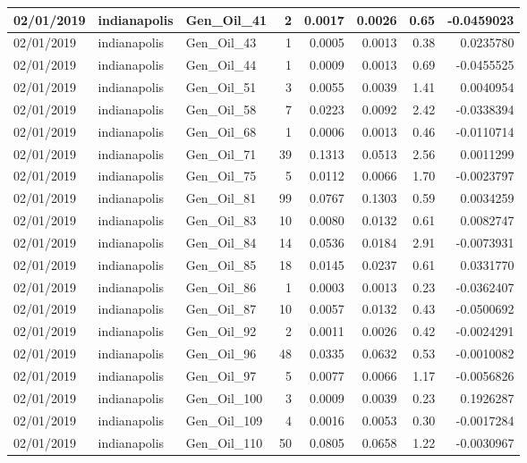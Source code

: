 \documentclass[
  letterpaper,
  DIV=11,
  numbers=noendperiod]{scrartcl}
\begin{document}
\begin{tabular}{l|l|l|r|r|r|r|r}
\hline
02/01/2019 & indianapolis & Gen\_Oil\_41 & 2 & 0.0017 & 0.0026 & 0.65 & -0.0459023\\
\hline
02/01/2019 & indianapolis & Gen\_Oil\_43 & 1 & 0.0005 & 0.0013 & 0.38 & 0.0235780\\
\hline
02/01/2019 & indianapolis & Gen\_Oil\_44 & 1 & 0.0009 & 0.0013 & 0.69 & -0.0455525\\
\hline
02/01/2019 & indianapolis & Gen\_Oil\_51 & 3 & 0.0055 & 0.0039 & 1.41 & 0.0040954\\
\hline
02/01/2019 & indianapolis & Gen\_Oil\_58 & 7 & 0.0223 & 0.0092 & 2.42 & -0.0338394\\
\hline
02/01/2019 & indianapolis & Gen\_Oil\_68 & 1 & 0.0006 & 0.0013 & 0.46 & -0.0110714\\
\hline
02/01/2019 & indianapolis & Gen\_Oil\_71 & 39 & 0.1313 & 0.0513 & 2.56 & 0.0011299\\
\hline
02/01/2019 & indianapolis & Gen\_Oil\_75 & 5 & 0.0112 & 0.0066 & 1.70 & -0.0023797\\
\hline
02/01/2019 & indianapolis & Gen\_Oil\_81 & 99 & 0.0767 & 0.1303 & 0.59 & 0.0034259\\
\hline
02/01/2019 & indianapolis & Gen\_Oil\_83 & 10 & 0.0080 & 0.0132 & 0.61 & 0.0082747\\
\hline
02/01/2019 & indianapolis & Gen\_Oil\_84 & 14 & 0.0536 & 0.0184 & 2.91 & -0.0073931\\
\hline
02/01/2019 & indianapolis & Gen\_Oil\_85 & 18 & 0.0145 & 0.0237 & 0.61 & 0.0331770\\
\hline
02/01/2019 & indianapolis & Gen\_Oil\_86 & 1 & 0.0003 & 0.0013 & 0.23 & -0.0362407\\
\hline
02/01/2019 & indianapolis & Gen\_Oil\_87 & 10 & 0.0057 & 0.0132 & 0.43 & -0.0500692\\
\hline
02/01/2019 & indianapolis & Gen\_Oil\_92 & 2 & 0.0011 & 0.0026 & 0.42 & -0.0024291\\
\hline
02/01/2019 & indianapolis & Gen\_Oil\_96 & 48 & 0.0335 & 0.0632 & 0.53 & -0.0010082\\
\hline
02/01/2019 & indianapolis & Gen\_Oil\_97 & 5 & 0.0077 & 0.0066 & 1.17 & -0.0056826\\
\hline
02/01/2019 & indianapolis & Gen\_Oil\_100 & 3 & 0.0009 & 0.0039 & 0.23 & 0.1926287\\
\hline
02/01/2019 & indianapolis & Gen\_Oil\_109 & 4 & 0.0016 & 0.0053 & 0.30 & -0.0017284\\
\hline
02/01/2019 & indianapolis & Gen\_Oil\_110 & 50 & 0.0805 & 0.0658 & 1.22 & -0.0030967\\

\end{tabular}
\end{document}
